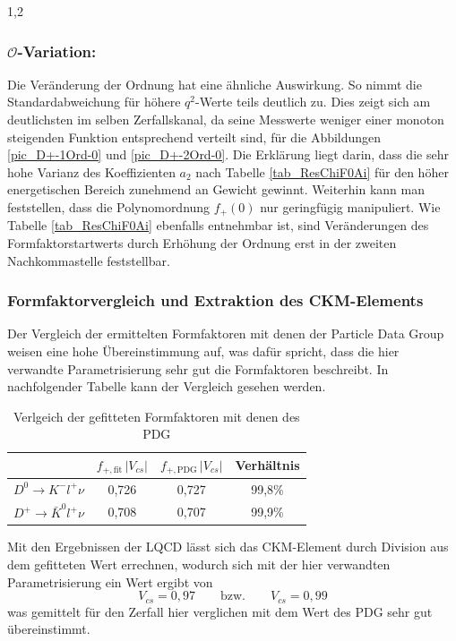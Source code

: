 \documentclass[11pt,a4paper,twoside,draft]{report}
\begin{document}
\begin{spacing}{1,2}
\subsubsection*{$\mathcal{O}$-Variation:}
Die Veränderung der Ordnung hat eine ähnliche Auswirkung. So nimmt die Standardabweichung für höhere $q^2$-Werte teils deutlich zu. Dies zeigt sich 
am deutlichsten im selben Zerfallskanal, da seine Messwerte weniger einer monoton steigenden Funktion entsprechend verteilt sind, für die 
Abbildungen \ref{pic_D+-1Ord-0} und \ref{pic_D+-2Ord-0}. Die Erklärung liegt darin, dass die sehr hohe Varianz des Koeffizienten $a_2$ nach Tabelle
\ref{tab_ResChiF0Ai} für den höher energetischen Bereich zunehmend an Gewicht gewinnt. Weiterhin kann man feststellen, dass die Polynomordnung 
$f_+(0)$ nur geringfügig manipuliert. Wie Tabelle \ref{tab_ResChiF0Ai} ebenfalls entnehmbar ist, sind Veränderungen des Formfaktorstartwerts durch 
Erhöhung der Ordnung erst in der zweiten Nachkommastelle feststellbar.

\subsubsection*{Formfaktorvergleich und Extraktion des CKM-Elements}
Der Vergleich der ermittelten Formfaktoren mit denen der Particle Data Group \cite{PDG} weisen eine hohe Übereinstimmung auf, was dafür spricht, 
dass die hier verwandte Parametrisierung sehr gut die Formfaktoren beschreibt. In nachfolgender Tabelle kann der Vergleich gesehen werden.
\begin{table}[h]
 \begin{tabular}{c|ccc}
 \toprule
  & $f_{+,\text{fit}}\,|V_{cs}|$ & $f_{+,\text{PDG}}\,|V_{cs}|$ & Verhältnis\\
  \midrule
  $D^0 \rightarrow K^- l^+ \nu$ & 0,726 & 0,727 & 99,8\% \\
  $D^+ \rightarrow \bar K^0 l^+ \nu$ & 0,708 & 0,707 & 99,9\% \\
  \bottomrule\bottomrule
 \end{tabular}
\caption{Verlgeich der gefitteten Formfaktoren mit denen des PDG}
\end{table}

\noindent
Mit den Ergebnissen der LQCD \cite{PhysRev_Data} lässt sich das CKM-Element durch Division aus dem gefitteten Wert errechnen, wodurch sich mit der hier
verwandten Parametrisierung ein Wert ergibt von
\begin{equation}
 V_{cs} = 0,97 \qquad \text{bzw.} \qquad V_{cs} = 0,99
\end{equation}
was gemittelt für den Zerfall hier verglichen mit dem Wert des PDG sehr gut übereinstimmt.



\end{spacing}
\end{document}
